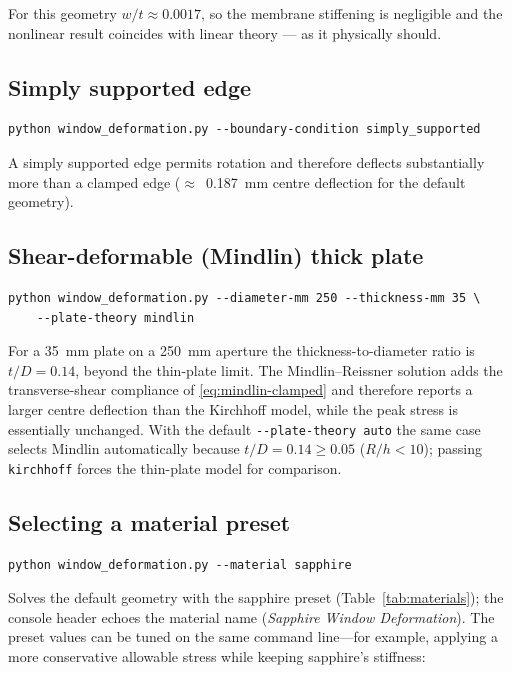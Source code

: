 \documentclass[11pt]{article}
\newcommand{\codeus}{\textunderscore\allowbreak}
\DeclareRobustCommand{\code}[1]{\texttt{\ifmmode\else\renewcommand{\_}{\codeus}\fi#1}}
\begin{document}
For this geometry $w/t \approx 0.0017$, so the membrane stiffening is negligible
and the nonlinear result coincides with linear theory --- as it physically should.

\subsection{Simply supported edge}

\begin{lstlisting}[style=shellstyle]
python window_deformation.py --boundary-condition simply_supported
\end{lstlisting}

A simply supported edge permits rotation and therefore deflects substantially more
than a clamped edge ($\approx$~\qty{0.187}{\milli\meter} centre deflection for the default
geometry).

\subsection{Shear-deformable (Mindlin) thick plate}
\label{sec:mindlin-example}

\begin{lstlisting}[style=shellstyle]
python window_deformation.py --diameter-mm 250 --thickness-mm 35 \
    --plate-theory mindlin
\end{lstlisting}

For a \qty{35}{\milli\meter} plate on a \qty{250}{\milli\meter} aperture the thickness-to-diameter ratio is
$t/D = 0.14$, beyond the thin-plate limit. The Mindlin--Reissner solution adds the
transverse-shear compliance of \eqref{eq:mindlin-clamped} and therefore reports a
larger centre deflection than the Kirchhoff model, while the peak stress is
essentially unchanged. With the default \code{-{}-plate-theory auto} the same case
selects Mindlin automatically because $t/D = 0.14 \ge 0.05$ ($R/h < 10$); passing
\code{kirchhoff} forces the thin-plate model for comparison.

\subsection{Selecting a material preset}
\label{sec:material-example}

\begin{lstlisting}[style=shellstyle]
python window_deformation.py --material sapphire
\end{lstlisting}

\noindent Solves the default geometry with the sapphire preset
(Table~\ref{tab:materials}); the console header echoes the material name
(\emph{Sapphire Window Deformation}). The preset values can be tuned on the same
command line---for example, applying a more conservative allowable stress while
keeping sapphire's stiffness:
\end{document}
